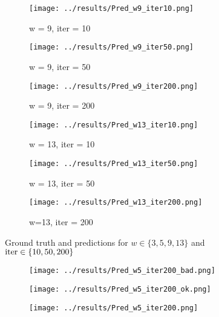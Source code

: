 \documentclass{article}
\begin{document}
{\begin{figure}
    \begin{subfigure}[t]{0.15\textwidth}
        \centering
        \texttt{[image: ../results/Pred\_w9\_iter10.png]}
        \caption{w = 9, iter = 10}
    \end{subfigure}
    \begin{subfigure}[t]{0.15\textwidth}
        \centering
        \texttt{[image: ../results/Pred\_w9\_iter50.png]}
        \caption{w = 9, iter = 50}
    \end{subfigure}
    \begin{subfigure}[t]{0.15\textwidth}
        \centering
        \texttt{[image: ../results/Pred\_w9\_iter200.png]}
        \caption{w = 9, iter = 200}
    \end{subfigure}

    \begin{subfigure}[t]{0.15\textwidth}
        \centering
        \texttt{[image: ../results/Pred\_w13\_iter10.png]}
        \caption{w = 13, iter = 10}
    \end{subfigure}
    \begin{subfigure}[t]{0.15\textwidth}
        \centering
        \texttt{[image: ../results/Pred\_w13\_iter50.png]}
        \caption{w = 13, iter = 50}
    \end{subfigure}    
    \begin{subfigure}[t]{0.15\textwidth}
        \centering
        \texttt{[image: ../results/Pred\_w13\_iter200.png]}
        \caption{w=13, iter = 200}
    \end{subfigure}
    
    \caption{Ground truth and predictions for $w \in \{3,5,9,13\}$ and $\textnormal{iter} \in \{10, 50, 200\}$}

\end{figure}
\begin{figure}
\centering

	\begin{subfigure}[b]{0.15\textwidth}
		\centering    
        \texttt{[image: ../results/Pred\_w5\_iter200\_bad.png]}
    \end{subfigure}
	\begin{subfigure}[b]{0.15\textwidth}
		\centering    
        \texttt{[image: ../results/Pred\_w5\_iter200\_ok.png]}
    \end{subfigure}
	\begin{subfigure}[b]{0.15\textwidth}
		\centering    
        \texttt{[image: ../results/Pred\_w5\_iter200.png]}
    \end{subfigure}
    

\end{figure}}
\end{document}
